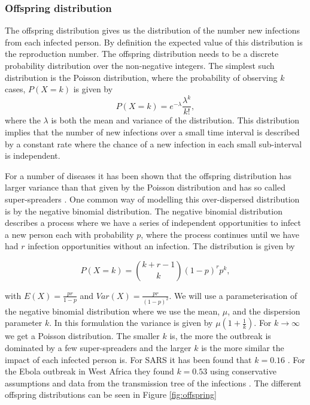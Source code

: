 \documentclass[12pt]{article}
\begin{document}
\subsubsection{Offspring distribution}
The offspring distribution gives us the distribution of the number new infections from each infected person. By definition the expected value of this distribution is the reproduction number. The offspring distribution needs to be a discrete probability distribution over the non-negative integers. The simplest such distribution is the Poisson distribution, where the probability of observing $k$ cases, $P(X=k)$ is given by
\[P(X=k) = e^{-\lambda}\frac{\lambda^k}{k!}, \]
where the $\lambda$ is both the mean and variance of the distribution. This distribution implies that the number of new infections over a small time interval is described by a constant rate where the chance of a new infection in each small sub-interval is independent.

For a number of diseases it has been shown that the offspring distribution has larger variance than that given by the Poisson distribution and has so called super-spreaders \cite{lloyd-smithSuperspreadingEffectIndividual2005}. One common way of modelling this over-dispersed distribution is by the negative binomial distribution. The negative binomial distribution describes a process where we have a series of independent opportunities to infect a new person each with probability $p$, where the process continues until we have had $r$ infection opportunities without an infection. The distribution is given by

\[P(X=k) = {k + r - 1 \choose k} (1-p)^rp^k, \]

with $E(X)=\frac{pr}{1-p}$ and $Var(X) = \frac{pr}{(1-p)^2}$. We will use a parameterisation of the negative binomial distribution where we use the mean, $\mu$, and the dispersion parameter $k$. In this formulation the variance is given by $\mu(1 + \frac{1}{k})$. For $k \rightarrow \infty$ we get a Poisson distribution. The smaller $k$ is, the more the outbreak is dominated by a few super-spreaders and the larger $k$ is the more similar the impact of each infected person is. For SARS it has been found that $k=0.16$ \cite{lloyd-smithSuperspreadingEffectIndividual2005}. For the Ebola outbreak in West Africa they found $k=0.53$ using conservative assumptions and data from the transmission tree of the infections \cite{internationalebolaresponseteamExposurePatternsDriving2016}. The different offspring distributions can be seen in Figure \ref{fig:offspring}
\end{document}
